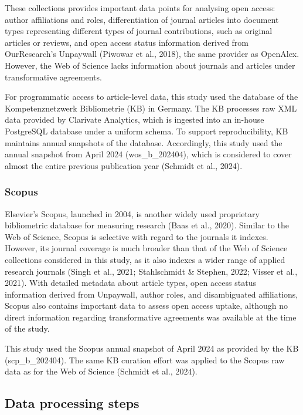 \documentclass[a4paper,man,floatsintext,longtable,noextraspace,10pt]{apa6}
\begin{document}
These collections provides important data points for analysing open
access: author affiliations and roles, differentiation of journal
articles into document types representing different types of journal
contributions, such as original articles or reviews, and open access
status information derived from OurResearch's Unpaywall (Piwowar et al.,
2018), the same provider as OpenAlex. However, the Web of Science lacks
information about journals and articles under transformative agreements.

For programmatic access to article-level data, this study used the
database of the Kompetenznetzwerk Bibliometrie (KB) in Germany. The KB
processes raw XML data provided by Clarivate Analytics, which is
ingested into an in-house PostgreSQL database under a uniform schema. To
support reproducibility, KB maintains annual snapshots of the database.
Accordingly, this study used the annual snapshot from April 2024
(wos\_b\_202404), which is considered to cover almost the entire
previous publication year (Schmidt et al., 2024).

\subsubsection{Scopus}\label{scopus}

Elsevier's Scopus, launched in 2004, is another widely used proprietary
bibliometric database for measuring research (Baas et al., 2020).
Similar to the Web of Science, Scopus is selective with regard to the
journals it indexes. However, its journal coverage is much broader than
that of the Web of Science collections considered in this study, as it
also indexes a wider range of applied research journals (Singh et al.,
2021; Stahlschmidt \& Stephen, 2022; Visser et al., 2021). With detailed
metadata about article types, open access status information derived
from Unpaywall, author roles, and disambiguated affiliations, Scopus
also contains important data to assess open access uptake, although no
direct information regarding transformative agreements was available at
the time of the study.

This study used the Scopus annual snapshot of April 2024 as provided by
the KB (scp\_b\_202404). The same KB curation effort was applied to the
Scopus raw data as for the Web of Science (Schmidt et al., 2024).

\subsection{Data processing steps}\label{data-processing-steps}
\end{document}

